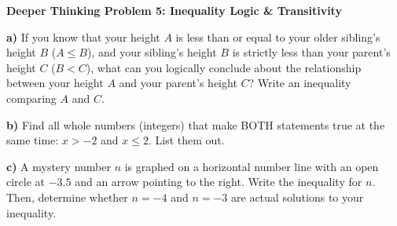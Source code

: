 \documentclass[12pt, letterpaper, fleqn]{article}
\begin{document}
\newpage
\begin{tcolorbox}[colback=white, colframe=black, boxrule=1pt, arc=4mm, left=6mm, right=6mm, top=5mm, bottom=5mm]
\textbf{Deeper Thinking Problem 5: Inequality Logic \& Transitivity}

\medskip

\noindent
\textbf{a)} If you know that your height $A$ is less than or equal to your older sibling's height $B$ ($A \le B$), and your sibling's height $B$ is strictly less than your parent's height $C$ ($B < C$), what can you logically conclude about the relationship between your height $A$ and your parent's height $C$? Write an inequality comparing $A$ and $C$.

\vspace{4cm}

\noindent
\textbf{b)} Find all whole numbers (integers) that make BOTH statements true at the same time: $x > -2$ and $x \le 2$. List them out.

\vspace{5cm}

\noindent
\textbf{c)} A mystery number $n$ is graphed on a horizontal number line with an open circle at $-3.5$ and an arrow pointing to the right. Write the inequality for $n$. Then, determine whether $n = -4$ and $n = -3$ are actual solutions to your inequality.
\vspace{5cm}
\end{tcolorbox}
\end{document}
